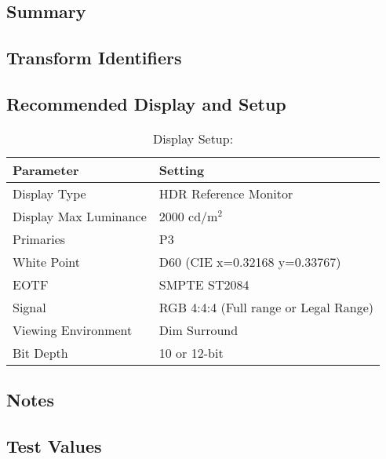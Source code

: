 \section[P3-D60 ST2084 (2000 nits)]{\shortName{}}
\label{sec:odt-details-\id}

\subsection{Summary}
\label{subsec:summary-\id}

\lipsum[1-2] %

\subsection{Transform Identifiers} 
\label{subsec:odt-ident-\id}

\subsection{Recommended Display and Setup}
\label{subsec:setup-\id}

\begin{table}[ht!]
    \centering
        \begin{tabular}{|p{1.5in}|p{3in}|}
            \hline
            \textbf{Parameter} 		& 	\textbf{Setting} 				 		\\ \hline
            Display Type 			&	HDR Reference Monitor					\\ \hline
            Display Max Luminance 	& 	2000 cd/m$^2$							\\ \hline
            Primaries	 			& 	P3										\\ \hline
            White Point	 			& 	D60 (CIE x=0.32168 y=0.33767)			\\ \hline
            EOTF					& 	SMPTE ST2084		 					\\ \hline
            Signal 					&	RGB 4:4:4 (Full range or Legal Range)	\\ \hline
            Viewing Environment 	& 	Dim Surround 							\\ \hline
            Bit Depth 				& 	10 or 12-bit	 						\\ \hline 
    \end{tabular}
    \caption{Display Setup: \shortName{}} 
    \label{tab:setup-\id}
\end{table}

\subsection{Notes}
\label{subsec:notes-\id}

\lipsum[1-2] %


\subsection{Test Values}
\label{subsec:testValues-\id}

\testValuesSubSec{}
